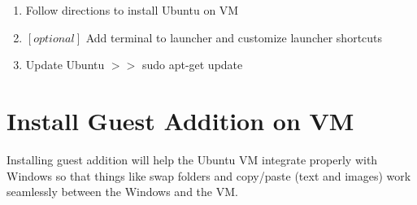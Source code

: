 \documentclass{scrartcl}
\begin{document}
\begin{enumerate}
	\item Follow directions to install Ubuntu on VM
	\item $[optional]$ Add terminal to launcher and customize launcher shortcuts
	\item Update Ubuntu $>>$ sudo apt-get update
	
\end{enumerate}

\section{Install Guest Addition on VM}
\label{sec:guest_additions}

Installing guest addition will help the Ubuntu VM integrate properly with Windows so that things like swap folders and copy/paste (text and images) work seamlessly between the Windows and the VM.
\end{document}
